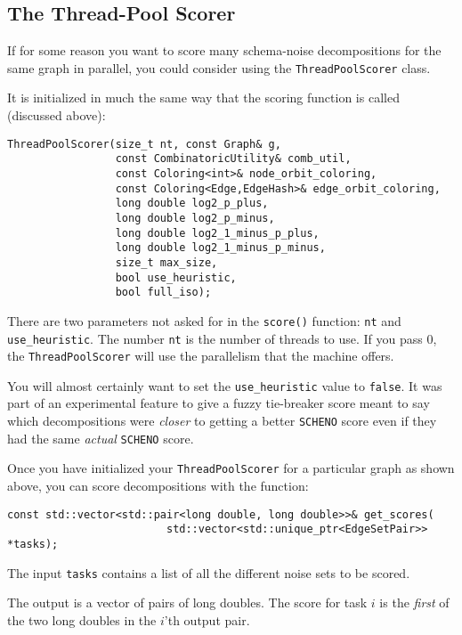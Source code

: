 \documentclass{article}
\begin{document}
\subsection{The Thread-Pool Scorer}

If for some reason you want to score many schema-noise decompositions for the same graph in parallel, you could consider using the \verb|ThreadPoolScorer| class.

It is initialized in much the same way that the scoring function is called (discussed above):

\begin{verbatim}
ThreadPoolScorer(size_t nt, const Graph& g,
                 const CombinatoricUtility& comb_util,
                 const Coloring<int>& node_orbit_coloring,
                 const Coloring<Edge,EdgeHash>& edge_orbit_coloring,
                 long double log2_p_plus,
                 long double log2_p_minus,
                 long double log2_1_minus_p_plus,
                 long double log2_1_minus_p_minus,
                 size_t max_size,
                 bool use_heuristic,
                 bool full_iso);
\end{verbatim}

There are two parameters not asked for in the \verb|score()| function: \verb|nt| and \verb|use_heuristic|. The number \verb|nt| is the number of threads to use. If you pass $0$, the \verb|ThreadPoolScorer| will use the parallelism that the machine offers.

You will almost certainly want to set the \verb|use_heuristic| value to \verb|false|. It was part of an experimental feature to give a fuzzy tie-breaker score meant to say which decompositions were \emph{closer} to getting a better \verb|SCHENO| score even if they had the same \emph{actual} \verb|SCHENO| score.

Once you have initialized your \verb|ThreadPoolScorer| for a particular graph as shown above, you can score decompositions with the function:

\begin{verbatim}
const std::vector<std::pair<long double, long double>>& get_scores(
                         std::vector<std::unique_ptr<EdgeSetPair>> *tasks);
\end{verbatim}

The input \verb|tasks| contains a list of all the different noise sets to be scored.

The output is a vector of pairs of long doubles. The score for task $i$ is the \emph{first} of the two long doubles in the $i$'th output pair.
\end{document}
